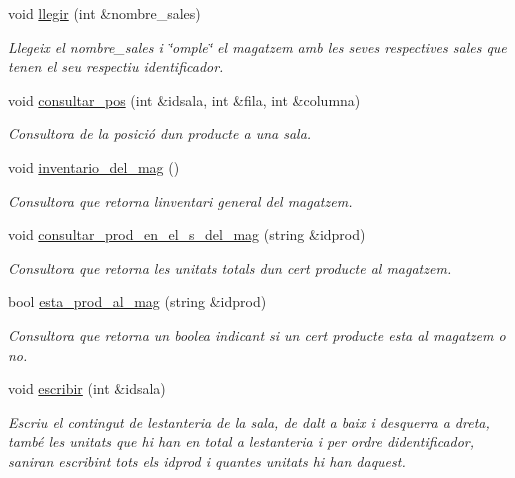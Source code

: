 \begin{DoxyCompactItemize}
void \hyperlink{class_magatzem_acb77f36344a5cb8e5590487766400d1c}{llegir} (int \&nombre\+\_\+sales)
\begin{DoxyCompactList}\small\item\em Llegeix el nombre\+\_\+sales i \char`\"{}omple\char`\"{} el magatzem amb les seves respectives sales que tenen el seu respectiu identificador. \end{DoxyCompactList}\item 
void \hyperlink{class_magatzem_a08da684e5a033414ccf05182b3993b5b}{consultar\+\_\+pos} (int \&idsala, int \&fila, int \&columna)
\begin{DoxyCompactList}\small\item\em Consultora de la posició d\textquotesingle{}un producte a una sala. \end{DoxyCompactList}\item 
void \hyperlink{class_magatzem_a504a5bbe9daa97e89f55caef7e234a0d}{inventario\+\_\+del\+\_\+mag} ()
\begin{DoxyCompactList}\small\item\em Consultora que retorna l\textquotesingle{}inventari general del magatzem. \end{DoxyCompactList}\item 
void \hyperlink{class_magatzem_a0ce25c60c4ecb22acbc42836f160d770}{consultar\+\_\+prod\+\_\+en\+\_\+el\+\_\+s\+\_\+del\+\_\+mag} (string \&idprod)
\begin{DoxyCompactList}\small\item\em Consultora que retorna les unitats totals d\textquotesingle{}un cert producte al magatzem. \end{DoxyCompactList}\item 
bool \hyperlink{class_magatzem_a401014dc25c79a3b0abbe05e4419d757}{esta\+\_\+prod\+\_\+al\+\_\+mag} (string \&idprod)
\begin{DoxyCompactList}\small\item\em Consultora que retorna un boolea indicant si un cert producte esta al magatzem o no. \end{DoxyCompactList}\item 
void \hyperlink{class_magatzem_a00b0dca704cec9b018c7cbd2a77a583a}{escribir} (int \&idsala)
\begin{DoxyCompactList}\small\item\em Escriu el contingut de l\textquotesingle{}estanteria de la sala, de dalt a baix i d\textquotesingle{}esquerra a dreta, també les unitats que hi han en total a l\textquotesingle{}estanteria i per ordre d\textquotesingle{}identificador, s\textquotesingle{}aniran escribint tots els idprod i quantes unitats hi han d\textquotesingle{}aquest. \end{DoxyCompactList}\end{DoxyCompactItemize}
